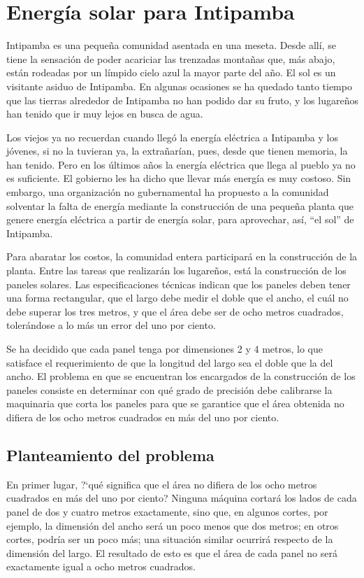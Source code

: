 \section{Energía solar para Intipamba}
Intipamba es una pequeña comunidad asentada en una meseta. Desde allí, se tiene la sensación de
poder acariciar las trenzadas montañas que, más abajo, están rodeadas por un límpido cielo azul la
mayor parte del año. El sol es un visitante asiduo de Intipamba. En algunas ocasiones se ha quedado
tanto tiempo que las tierras alrededor de Intipamba no han podido dar su fruto, y los lugareños han
tenido que ir muy lejos en busca de agua.

Los viejos ya no recuerdan cuando llegó la energía eléctrica a Intipamba y los jóvenes, si no la
tuvieran ya, la extrañarían, pues, desde que tienen memoria, la han tenido. Pero en los últimos
años la energía eléctrica que llega al pueblo ya no es suficiente. El gobierno les ha dicho que
llevar más energía es muy costoso. Sin embargo, una organización no gubernamental ha propuesto a la
comunidad solventar la falta de energía mediante la construcción de una pequeña planta que genere
energía eléctrica a partir de energía solar, para aprovechar, así, ``el sol'' de Intipamba.

Para abaratar los costos, la comunidad entera participará en la construcción de la planta. Entre
las tareas que realizarán los lugareños, está la construcción de los paneles solares. Las
especificaciones técnicas indican que los paneles deben tener una forma rectangular, que el largo
debe medir el doble que el ancho, el cuál no debe superar los tres metros, y que el área debe ser
de ocho metros cuadrados, tolerándose a lo más un error del uno por ciento.

Se ha decidido que cada panel tenga por dimensiones 2 y 4 metros, lo que satisface el requerimiento
de que la longitud del largo sea el doble que la del ancho. El problema en que se encuentran los
encargados de la construcción de los paneles consiste en determinar con qué grado de precisión debe
calibrarse la maquinaria que corta los paneles para que se garantice que el área obtenida no
difiera de los ocho metros cuadrados en más del uno por ciento.

\subsection{Planteamiento del problema}

En primer lugar, ?`qué significa que el área no difiera de los ocho metros cuadrados en más del uno
por ciento? Ninguna máquina cortará los lados de cada panel de dos y cuatro metros exactamente,
sino que, en algunos cortes, por ejemplo, la dimensión del ancho será un poco menos que dos metros;
en otros cortes, podría ser un poco más; una situación similar ocurrirá respecto de la dimensión
del largo. El resultado de esto es que el área de cada panel no será exactamente igual a ocho
metros cuadrados.

